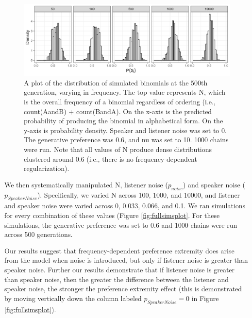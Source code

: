 \documentclass[10pt, letterpaper]{article}
\newenvironment{CodeChunk}{}{}
\begin{document}
\begin{CodeChunk}
\begin{figure}[tb]

{\centering \includegraphics[width=1\linewidth]{Figures/noNoise} 

}

\caption[A plot of the distribution of simulated binomials at the 500th generation, varying in frequency]{A plot of the distribution of simulated binomials at the 500th generation, varying in frequency. The top value represents N, which is the overall frequency of a binomial regardless of ordering (i.e., count(AandB) + count(BandA). On the x-axis is the predicted probability of producing the binomial in alphabetical form. On the y-axis is probability density. Speaker and listener noise was set to 0. The generative preference was 0.6, and nu was set to 10. 1000 chains were run. Note that all values of N produce dense distributions clustered around 0.6 (i.e., there is no frequency-dependent regularization).}\label{fig:noNoisePlot}
\end{figure}
\end{CodeChunk}

We then systematically manipulated N, listener noise (\(p_{noise}\)) and
speaker noise (\(p_{SpeakerNoise}\)). Specifically, we varied N across
100, 1000, and 10000, and listener and speaker noise were varied across
0, 0.033, 0.066, and 0.1. We ran simulations for every combination of
these values (Figure \ref{fig:fullsimsplot}. For these simulations, the
generative preference was set to 0.6 and 1000 chains were run across 500
generations.

Our results suggest that frequency-dependent preference extremity does
arise from the model when noise is introduced, but only if listener
noise is greater than speaker noise. Further our results demonstrate
that if listener noise is greater than speaker noise, then the greater
the difference between the listener and speaker noise, the stronger the
preference extremity effect (this is demonstrated by moving vertically
down the column labeled \(p_{SpeakerNoise} = 0\) in Figure
\ref{fig:fullsimsplot}).
\end{document}
